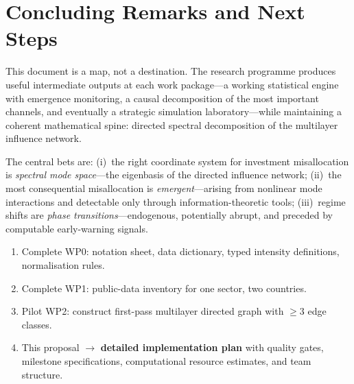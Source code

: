 \documentclass[11pt,a4paper]{article}
\theoremstyle{definition}
\begin{document}
\section{Concluding Remarks and Next Steps}
\label{sec:conclusion}

This document is a map, not a destination. The research programme produces useful intermediate outputs at each work package---a working statistical engine with emergence monitoring, a causal decomposition of the most important channels, and eventually a strategic simulation laboratory---while maintaining a coherent mathematical spine: directed spectral decomposition of the multilayer influence network.

The central bets are: (i)~the right coordinate system for investment misallocation is \emph{spectral mode space}---the eigenbasis of the directed influence network; (ii)~the most consequential misallocation is \emph{emergent}---arising from nonlinear mode interactions and detectable only through information-theoretic tools; (iii)~regime shifts are \emph{phase transitions}---endogenous, potentially abrupt, and preceded by computable early-warning signals.

\begin{redbox}
\begin{enumerate}[nosep]
  \item Complete WP0: notation sheet, data dictionary, typed intensity definitions, normalisation rules.
  \item Complete WP1: public-data inventory for one sector, two countries.
  \item Pilot WP2: construct first-pass multilayer directed graph with $\geq 3$ edge classes.
  \item This proposal $\to$ \textbf{detailed implementation plan} with quality gates, milestone specifications, computational resource estimates, and team structure.
\end{enumerate}
\end{redbox}
\end{document}
